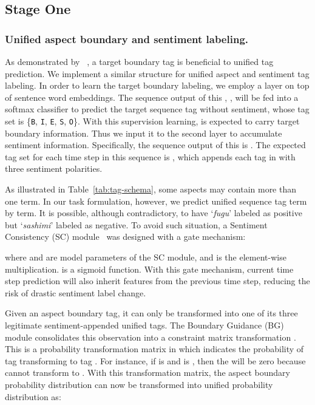 \documentclass[letterpaper]{article} \usepackage{aaai20}  \usepackage{times}  \usepackage{helvet} \usepackage{courier}  \usepackage[hyphens]{url}  \usepackage{graphicx} \urlstyle{rm} \def\UrlFont{\rm}  \usepackage{graphicx}  \frenchspacing  \setlength{\pdfpagewidth}{8.5in}  \setlength{\pdfpageheight}{11in}
\newcommand{\citet}[1]
{\citeauthor{#1}~\shortcite{#1}}
\begin{document}
\subsection{Stage One} 

\subsubsection{Unified aspect boundary and sentiment labeling.}

As demonstrated by \citet{li2019unified}, a target boundary tag is beneficial to unified tag prediction. We implement a similar structure for unified aspect and sentiment tag labeling. 
In order to learn the target boundary labeling, we employ a  layer on top of sentence word embeddings. 
The sequence output of this ,
, 
will be fed into a softmax classifier to predict the target sequence tag without sentiment, whose tag set
 is \{\texttt{B}, \texttt{I}, \texttt{E}, \texttt{S}, \texttt{O}\}. With this supervision learning, 
 is expected to carry target boundary information. Thus we input it to the second  layer to accumulate sentiment information. 
Specifically, the sequence output of this  is . The expected tag set for each time step in this sequence is , which appends each tag in  with three sentiment polarities.

As illustrated in Table~\ref{tab:tag-schema}, some aspects may contain more than one term. In our task formulation, however, we predict unified sequence tag term by term. It is possible, although contradictory, to have `\textit{fugu}' labeled as positive but `\textit{sashimi}' labeled as negative. To avoid such situation, a Sentiment Consistency (SC) module~\cite{li2019unified} was designed with a gate mechanism:

where  and  are model parameters of the SC module, and  is the element-wise multiplication.  is a sigmoid function. With this gate mechanism, current time step prediction will also inherit features from the previous time step, reducing the risk of drastic sentiment label change.



Given an aspect boundary tag, it can only be transformed into one of its three legitimate sentiment-appended unified tags. The Boundary Guidance (BG) module consolidates this observation into a constraint matrix transformation . This is a probability transformation matrix in which  indicates the probability of tag  transforming to tag . For instance, if  is  and  is , then the  will be zero because  cannot transform to . With this transformation matrix, the aspect boundary probability distribution can now be transformed into unified probability distribution as:
 
\end{document}
